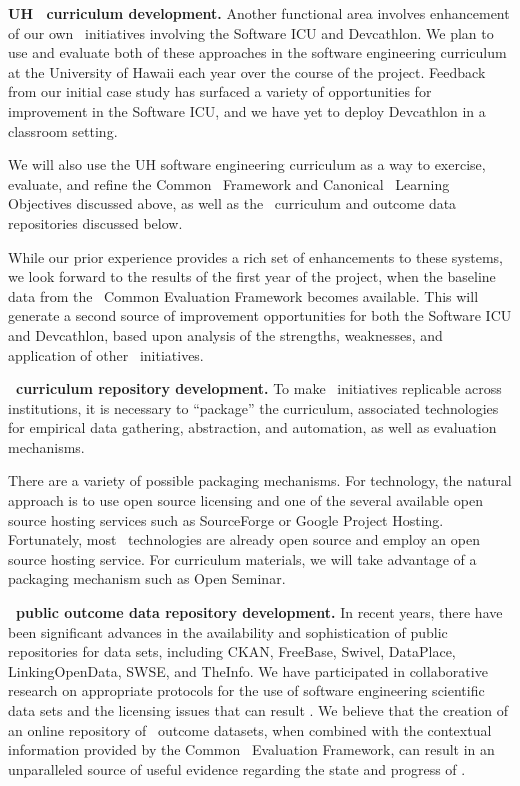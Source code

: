 {\bf UH \eCT\ curriculum development.}  Another functional area involves
enhancement of our own \eCT\ initiatives involving the Software ICU and
Devcathlon. We plan to use and evaluate both of these approaches in the
software engineering curriculum at the University of Hawaii each year over
the course of the project.  Feedback from our initial case study
\citep{csdl2-09-02,csdl2-09-03} has surfaced a variety of opportunities for
improvement in the Software ICU, and we have yet to deploy Devcathlon in a
classroom setting.

We will also use the UH software engineering curriculum as a way to
exercise, evaluate, and refine the Common \eCT\ Framework and Canonical
\eCT\ Learning Objectives discussed above, as well as the \eCT\ curriculum
and outcome data repositories discussed below.

While our prior experience provides a rich set of enhancements to these
systems, we look forward to the results of the first year of the project,
when the baseline data from the \eCT\ Common Evaluation Framework becomes
available.  This will generate a second source of improvement opportunities
for both the Software ICU and Devcathlon, based upon analysis of the
strengths, weaknesses, and application of other \eCT\ initiatives. 

{\bf \eCT\ curriculum repository development.}  To make \eCT\ initiatives
replicable across institutions, it is necessary to ``package'' the
curriculum, associated technologies for empirical data gathering,
abstraction, and automation, as well as evaluation mechanisms.  

There are a variety of possible packaging mechanisms.  For technology, the 
natural approach is to use open source licensing and one of the several
available open source hosting services such as SourceForge or Google Project
Hosting.  Fortunately, most \eCT\ technologies are already open source and
employ an open source hosting service.  For curriculum materials, we will 
take advantage of a packaging mechanism such as Open Seminar. 

{\bf \eCT\ public outcome data repository development.}  In recent years,
there have been significant advances in the availability and sophistication
of public repositories for data sets, including CKAN, FreeBase, Swivel,
DataPlace, LinkingOpenData, SWSE, and TheInfo. We have participated in 
collaborative research on appropriate protocols for the use of software
engineering scientific data sets and the licensing issues that can result
\citep{csdl2-06-07}.  We believe that the creation of an online repository
of \eCT\ outcome datasets, when combined with the contextual information
provided by the Common \eCT\ Evaluation Framework, can result in an
unparalleled source of useful evidence regarding the state and progress of
\eCT.

